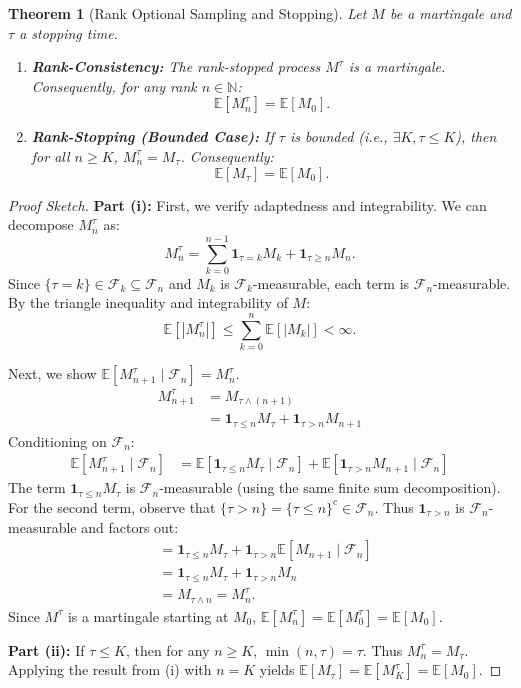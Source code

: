 \documentclass[11pt, a4paper]{article}
\newcommand{\CondExp}[2]{\mathbb{E}[#1 \mid \mathcal{F}_{#2}]}
\newcommand{\Nat}{\mathbb{N}}
\newcommand{\Ex}{\mathbb{E}}
\newcommand{\Ind}[1]{\mathbf{1}_{#1}}
\theoremstyle{plain}
\newtheorem{theorem}{Theorem}[section]
\theoremstyle{definition}
\theoremstyle{remark}
\begin{document}
\begin{theorem}[Rank Optional Sampling and Stopping] \label{thm:rank_ost}
Let $M$ be a martingale and $\tau$ a stopping time.
\begin{enumerate}
    \item[(i)] \textbf{Rank-Consistency:} The rank-stopped process $M^\tau$ is a martingale. Consequently, for any rank $n \in \Nat$:
    \[ \Ex[M^\tau_n] = \Ex[M_0]. \]
    \item[(ii)] \textbf{Rank-Stopping (Bounded Case):} If $\tau$ is bounded (i.e., $\exists K, \tau \le K$), then for all $n \ge K$, $M^\tau_n = M_\tau$. Consequently:
    \[ \Ex[M_\tau] = \Ex[M_0]. \]
\end{enumerate}
\end{theorem}

\begin{proof}[Proof Sketch]
\textbf{Part (i):} First, we verify adaptedness and integrability. We can decompose $M^\tau_n$ as:
\[ M^\tau_n = \sum_{k=0}^{n-1} \Ind{\tau=k} M_k + \Ind{\tau \ge n} M_n. \]
Since $\{\tau=k\} \in \mathcal{F}_k \subseteq \mathcal{F}_n$ and $M_k$ is $\mathcal{F}_k$-measurable, each term is $\mathcal{F}_n$-measurable. By the triangle inequality and integrability of $M$:
\[ \Ex[|M^\tau_n|] \le \sum_{k=0}^n \Ex[|M_k|] < \infty. \]

Next, we show $\CondExp{M^\tau_{n+1}}{n} = M^\tau_n$.
\begin{align*}
    M^\tau_{n+1} &= M_{\tau \land (n+1)} \\
    &= \Ind{\tau \le n} M_\tau + \Ind{\tau > n} M_{n+1}
\end{align*}
Conditioning on $\mathcal{F}_n$:
\begin{align*}
    \CondExp{M^\tau_{n+1}}{n} &= \CondExp{\Ind{\tau \le n} M_\tau}{n} + \CondExp{\Ind{\tau > n} M_{n+1}}{n}
\end{align*}
The term $\Ind{\tau \le n} M_\tau$ is $\mathcal{F}_n$-measurable (using the same finite sum decomposition). For the second term, observe that $\{\tau > n\} = \{\tau \le n\}^c \in \mathcal{F}_n$. Thus $\Ind{\tau > n}$ is $\mathcal{F}_n$-measurable and factors out:
\begin{align*}
    &= \Ind{\tau \le n} M_\tau + \Ind{\tau > n} \CondExp{M_{n+1}}{n} \\
    &= \Ind{\tau \le n} M_\tau + \Ind{\tau > n} M_n \\
    &= M_{\tau \land n} = M^\tau_n.
\end{align*}
Since $M^\tau$ is a martingale starting at $M_0$, $\Ex[M^\tau_n] = \Ex[M^\tau_0] = \Ex[M_0]$.

\textbf{Part (ii):} If $\tau \le K$, then for any $n \ge K$, $\min(n, \tau) = \tau$. Thus $M^\tau_n = M_\tau$. Applying the result from (i) with $n=K$ yields $\Ex[M_\tau] = \Ex[M^\tau_K] = \Ex[M_0]$.
\end{proof}
\end{document}
